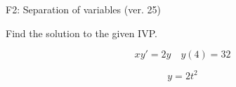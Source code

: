 \begin{exercise}
  \begin{exerciseTitle}F2: Separation of variables (ver. 25)\end{exerciseTitle}
  \begin{exerciseStatement}
    
Find the solution to the given IVP.

    
\[xy'= 2 y \hspace{1em} y( 4 ) = 32\]

  \end{exerciseStatement}
  \begin{exerciseAnswer}
    
\[y= 2 t^ 2\]

  \end{exerciseAnswer}
\end{exercise}